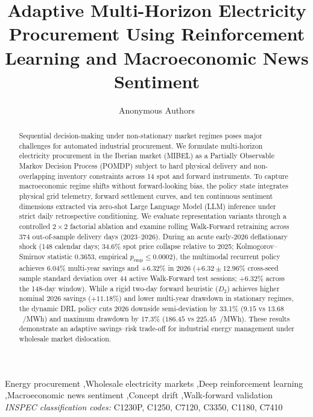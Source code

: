 \documentclass[final,5p,times,numbers]{elsarticle}
\renewcommand{\_}{\oldunderscore\allowbreak}
\begin{document}
\begin{frontmatter}

\title{Adaptive Multi-Horizon Electricity Procurement Using Reinforcement Learning and Macroeconomic News Sentiment}

\author{Anonymous Authors}

\begin{abstract}
Sequential decision-making under non-stationary market regimes poses major challenges for automated industrial procurement. We formulate multi-horizon electricity procurement in the Iberian market (MIBEL) as a Partially Observable Markov Decision Process (POMDP) subject to hard physical delivery and non-overlapping inventory constraints across 14 spot and forward instruments. To capture macroeconomic regime shifts without forward-looking bias, the policy state integrates physical grid telemetry, forward settlement curves, and ten continuous sentiment dimensions extracted via zero-shot Large Language Model (LLM) inference under strict daily retrospective conditioning. We evaluate representation variants through a controlled $2 \times 2$ factorial ablation and examine rolling Walk-Forward retraining across 374 out-of-sample delivery days (2023--2026). During an acute early-2026 deflationary shock (148 calendar days; 34.6\% spot price collapse relative to 2025; Kolmogorov--Smirnov statistic 0.3653, empirical $p_{\text{emp}} \le 0.0002$), the multimodal recurrent policy achieves 6.04\% multi-year savings and $+6.32\%$ in 2026 ($+6.32 \pm 12.96\%$ cross-seed sample standard deviation over 44 active Walk-Forward test sessions; $+6.32\%$ across the 148-day window). While a rigid two-day forward heuristic ($D_2$) achieves higher nominal 2026 savings ($+11.18\%$) and lower multi-year drawdown in stationary regimes, the dynamic DRL policy cuts 2026 downside semi-deviation by 33.1\% ($9.15$ vs $13.68$~\texteuro/MWh) and maximum drawdown by 17.3\% ($186.45$ vs $225.45$~\texteuro/MWh). These results demonstrate an adaptive savings--risk trade-off for industrial energy management under wholesale market dislocation.
\end{abstract}

\begin{keyword}
Energy procurement \sep Wholesale electricity markets \sep Deep reinforcement learning \sep Macroeconomic news sentiment \sep Concept drift \sep Walk-forward validation\\[0.3em]
\textit{INSPEC classification codes:} C1230P, C1250, C7120, C3350, C1180, C7410
\end{keyword}

\end{frontmatter}
\end{document}
